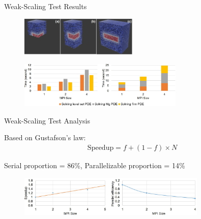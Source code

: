 \documentclass[11pt,t]{beamer}
\begin{document}
\begin{frame}[fragile]{Weak-Scaling Test Results}
	
\begin{figure}
	\centering
	\includegraphics[width=0.5\textwidth]{weak_scaling_models}
	
	
	\end{figure}
	
	
	\begin{figure}
	\centering
	\includegraphics[width=0.7\textwidth]{weak_scaling_results}
	
	\end{figure}
	

\end{frame}


\begin{frame}[fragile]{Weak-Scaling Test Analysis}

Based on Gustafson’s law:
\begin{gather*}
\mathrm{Speedup} = f + (1-f) \times N
\end{gather*}

Serial proportion = 86\%, Parallelizable proportion = 14\%

	\begin{figure}
			\centering
			\includegraphics[width=0.8\textwidth]{weak_scaling_analysis}
			
	\end{figure}


\end{frame}
\end{document}

